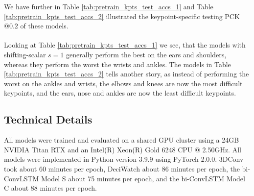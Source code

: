 \documentclass[./main.tex]{subfiles}
\begin{document}
\noindent We have further in Table \ref{tab:pretrain_kpts_test_accs_1} and Table \ref{tab:pretrain_kpts_test_accs_2} illustrated the keypoint-specific testing PCK$@0.2$ of these models.
\\
\\
Looking at Table \ref{tab:pretrain_kpts_test_accs_1} we see, that the models with shifting-scalar $s = 1$ generally perform the best on the ears and shoulders, whereas they perform the worst the wrists and ankles. The models in Table \ref{tab:pretrain_kpts_test_accs_2} tells another story, as instead of performing the worst on the ankles and wrists, the elbows and knees are now the most difficult keypoints, and the ears, nose and ankles are now the least difficult keypoints.

\subsection{Technical Details}
\label{sec:pretrain_tech_details}
All models were trained and evaluated on a shared GPU cluster using a 24GB NVIDIA Titan RTX and an Intel(R) Xeon(R) Gold 6248 CPU @ 2.50GHz. All models were implemented in Python version 3.9.9 using PyTorch 2.0.0. 3DConv took about 60 minutes per epoch, DeciWatch about 86 minutes per epoch, the bi-ConvLSTM Model S about 75 minutes per epoch, and the bi-ConvLSTM Model C about 88 minutes per epoch.
\end{document}

